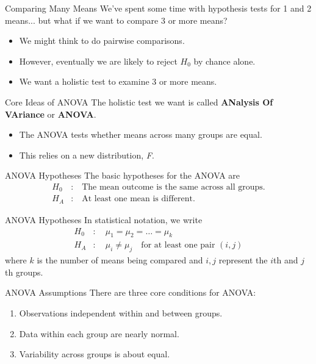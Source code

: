 \begin{frame}{Comparing Many Means}
    We've spent some time with hypothesis tests for 1 and 2 means... but what if we want to compare 3 or more means?
    \begin{itemize}
        \item We might think to do pairwise comparisons.
        \item However, eventually we are likely to reject $H_0$ by chance alone.
        \item We want a holistic test to examine 3 or more means.
    \end{itemize}
\end{frame}

\begin{frame}{Core Ideas of ANOVA}
    The holistic test we want is called \textbf{ANalysis Of VAriance} or \textbf{ANOVA}.
    \begin{itemize}
        \item The ANOVA tests whether means across many groups are equal.
        \item This relies on a new distribution, \textit{F}.
    \end{itemize}
\end{frame}

\begin{frame}{ANOVA Hypotheses}
    The basic hypotheses for the ANOVA are
    \begin{align*}
        H_0&: \quad \text{The mean outcome is the same across all groups.} \\
        H_A&: \quad \text{At least one mean is different.}
    \end{align*}
\end{frame}

\begin{frame}{ANOVA Hypotheses}
    In statistical notation, we write
    \begin{align*}
        H_0&: \quad \mu_1 = \mu_2 = \dots = \mu_k \\
        H_A&: \quad \mu_i \ne \mu_j \quad \text{for at least one pair } (i,j) 
    \end{align*}
    where $k$ is the number of means being compared and $i,j$ represent the $i$th and $j$th groups.
\end{frame}

\begin{frame}{ANOVA Assumptions}
    There are three core conditions for ANOVA:
    \begin{enumerate}
        \item Observations independent within and between groups.
        \item Data within each group are nearly normal.
        \item Variability across groups is about equal.
    \end{enumerate}
\end{frame}

